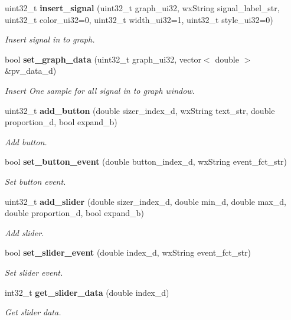 \begin{DoxyCompactItemize}
uint32\+\_\+t \textbf{ insert\+\_\+signal} (uint32\+\_\+t graph\+\_\+ui32, wx\+String signal\+\_\+label\+\_\+str, uint32\+\_\+t color\+\_\+ui32=0, uint32\+\_\+t width\+\_\+ui32=1, uint32\+\_\+t style\+\_\+ui32=0)
\begin{DoxyCompactList}\small\item\em Insert signal in to graph. \end{DoxyCompactList}\item 
bool \textbf{ set\+\_\+graph\+\_\+data} (uint32\+\_\+t graph\+\_\+ui32, vector$<$ double $>$ \&pv\+\_\+data\+\_\+d)
\begin{DoxyCompactList}\small\item\em Insert One sample for all signal in to graph window. \end{DoxyCompactList}\item 
uint32\+\_\+t \textbf{ add\+\_\+button} (double sizer\+\_\+index\+\_\+d, wx\+String text\+\_\+str, double proportion\+\_\+d, bool expand\+\_\+b)
\begin{DoxyCompactList}\small\item\em Add button. \end{DoxyCompactList}\item 
bool \textbf{ set\+\_\+button\+\_\+event} (double button\+\_\+index\+\_\+d, wx\+String event\+\_\+fct\+\_\+str)
\begin{DoxyCompactList}\small\item\em Set button event. \end{DoxyCompactList}\item 
uint32\+\_\+t \textbf{ add\+\_\+slider} (double sizer\+\_\+index\+\_\+d, double min\+\_\+d, double max\+\_\+d, double proportion\+\_\+d, bool expand\+\_\+b)
\begin{DoxyCompactList}\small\item\em Add slider. \end{DoxyCompactList}\item 
bool \textbf{ set\+\_\+slider\+\_\+event} (double index\+\_\+d, wx\+String event\+\_\+fct\+\_\+str)
\begin{DoxyCompactList}\small\item\em Set slider event. \end{DoxyCompactList}\item 
int32\+\_\+t \textbf{ get\+\_\+slider\+\_\+data} (double index\+\_\+d)
\begin{DoxyCompactList}\small\item\em Get slider data. \end{DoxyCompactList}\item 

\end{DoxyCompactItemize}

